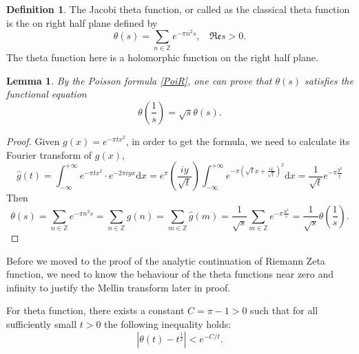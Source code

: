 \documentclass[12pt,a4paper,english]{article}
\theoremstyle{plain}
\newtheorem{lem}[thm]{Lemma}
\theoremstyle{definition}
\newtheorem{defi}{Definition}
\begin{document}
\begin{defi}
The Jacobi theta function, or called as the classical theta function is the on right half plane defined by 
\begin{equation*}
    \theta(s)=\sum_{n\in\mathbb{Z}}e^{-\pi n^{2}s},\ \ \ \ \mathfrak{Re}s>0.
\end{equation*}
The theta function here is a holomorphic function on the right half plane.
\end{defi}
\begin{lem}
By the Poisson formula \ref{PoiR}, one can prove that $\theta(s)$ satisfies the functional equation
\begin{equation*}
\theta(\frac{1}{s})=\sqrt{s}\theta(s).
\end{equation*}
\end{lem}

\begin{proof}
Given $g(x)=e^{-\pi tx^{2}}$, in order to get the formula, we need to calculate its Fourier transform of $g(x)$, 
\begin{equation*}
    \hat{g}(t)=\int^{+\infty}_{-\infty}e^{-\pi tx^{2}}\cdot e^{-2\pi iyx}\text{d}x=e^{\pi}(\frac{iy}{\sqrt{t}})\int^{+\infty}_{-\infty}e^{-\pi(\sqrt{t}x+\frac{ix}{\sqrt{t}})^{2}}\text{d}x=\frac{1}{\sqrt{t}} e^{-\pi \frac{y^{2}}{t}}
\end{equation*}
Then 
\begin{equation*}
    \theta(s)=\sum_{n\in\mathbb{Z}}e^{-\pi n^{2}s}=\sum_{n\in\mathbb{Z}}g(n)=\sum_{m\in\mathbb{Z}}\hat{g}(m)=\frac{1}{\sqrt{s}}\sum_{m\in\mathbb{Z}}e^{-\pi \frac{n^{2}}{s}}=\frac{1}{\sqrt{s}}\theta(\frac{1}{s}).
\end{equation*}
\end{proof}
Before we moved to the proof of the analytic continuation of Riemann Zeta function, we need to know the behaviour of the theta functions near zero and infinity to justify the Mellin transform later in proof.

For theta function, there exists a constant $C=\pi-1> 0$ such that for all sufficiently small $t>0$ the following inequality holds: 
\begin{equation*}
    |\theta(t)-t^{\frac{1}{2}}|< e^{-C/t}.
\end{equation*}
\end{document}

